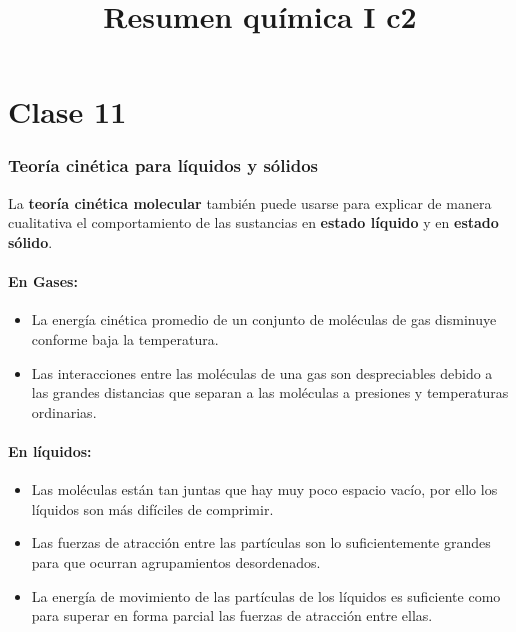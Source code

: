 \documentclass[]{article}
\title{Resumen química I c2}
\author{}
\date{}
\begin{document}
\maketitle
\tableofcontents
\clearpage



\part{Clase 11}



\section{Teoría cinética para líquidos y sólidos}
La \textbf{teoría cinética molecular} también puede usarse para explicar de manera cualitativa el comportamiento de las sustancias en \textbf{estado líquido} y en \textbf{estado sólido}.



\subsection{En Gases:}  

\begin{itemize}
	\item La energía cinética promedio de un conjunto de moléculas de gas disminuye conforme baja la temperatura.
	\item Las interacciones entre las moléculas de una gas son despreciables debido a las grandes distancias que separan a las moléculas a presiones y temperaturas ordinarias.
\end{itemize}



\subsection{En líquidos:}  

\begin{itemize}
	\item Las moléculas están tan juntas que hay muy poco espacio vacío, por ello los líquidos son más difíciles de comprimir.
	\item Las fuerzas de atracción entre las partículas son lo suficientemente grandes para que ocurran agrupamientos desordenados.
	\item La energía de movimiento de las partículas de los líquidos es suficiente como para superar en forma parcial las fuerzas de atracción entre ellas.
\end{itemize}
\end{document}
